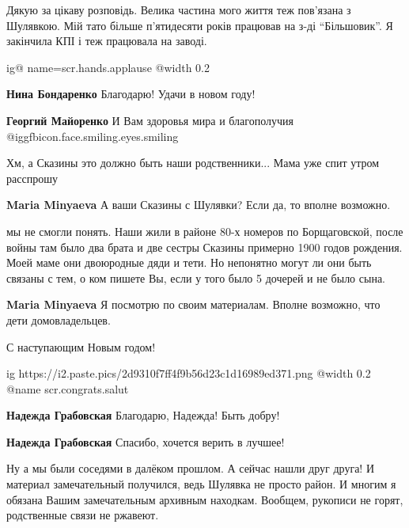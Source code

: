 \begin{itemize}
Дякую за цікаву розповідь. Велика частина мого життя теж пов'язана з Шулявкою.
Мій тато більше п'ятидесяти років працював на з-ді \enquote{Більшовик}. Я закінчила КПІ
і теж працювала на заводі.

\ifcmt
  ig@ name=scr.hands.applause
  @width 0.2
\fi

\begin{itemize} %
\textbf{Нина Бондаренко} Благодарю! Удачи в новом году!

\textbf{Георгий Майоренко} И Вам здоровья мира и благополучия  @igg{fbicon.face.smiling.eyes.smiling} 
\end{itemize} %

Хм, а Сказины это должно быть наши родственники... Мама уже спит утром расспрошу

\begin{itemize} %
\textbf{Maria Minyaeva} А ваши Сказины с Шулявки? Если да, то вполне возможно.


мы не смогли понять. Наши жили в районе 80-х номеров по Борщаговской, после
войны там было два брата и две сестры Сказины примерно 1900 годов рождения.
Моей маме они двоюродные дяди и тети. Но непонятно могут ли они быть связаны с
тем, о ком пишете Вы, если у того было 5 дочерей и не было сына.

\textbf{Maria Minyaeva} Я посмотрю по своим материалам. Вполне возможно, что дети домовладельцев.
\end{itemize} %

С наступающим Новым годом!

\ifcmt
  ig https://i2.paste.pics/2d9310f7ff4f9b56d23c1d16989ed371.png
  @width 0.2
	@name scr.congrats.salut
\fi

\begin{itemize} %
\textbf{Надежда Грабовская} Благодарю, Надежда! Быть добру!

\textbf{Надежда Грабовская} Спасибо, хочется верить в лучшее!
\end{itemize} %


Ну а мы были соседями в далёком прошлом. А сейчас нашли друг друга! И материал
замечательный получился, ведь Шулявка не просто район. И многим я обязана Вашим
замечательным архивным находкам. Вообщем, рукописи не горят, родственные связи
не ржавеют.



\end{itemize} %
